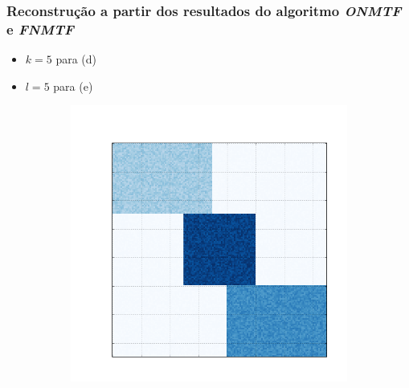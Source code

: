 \documentclass[10pt]{beamer}
\begin{document}
\begin{frame}
\frametitle{Reconstrução a partir dos resultados do algoritmo \textit{ONMTF} e \textit{FNMTF}}

  \begin{itemize}
    \item $k = 5$ para (d)
    \item $l = 5$ para (e)
  \end{itemize}

  \begin{figure}[H]
  \centering
      \begin{subfigure}[b]{0.2\textwidth}
          \includegraphics[width=\textwidth]{img/d-bic-structure.png}
      \end{subfigure}
      \begin{subfigure}[b]{0.2\textwidth}

\end{subfigure}
\end{figure}
\end{frame}
\end{document}

